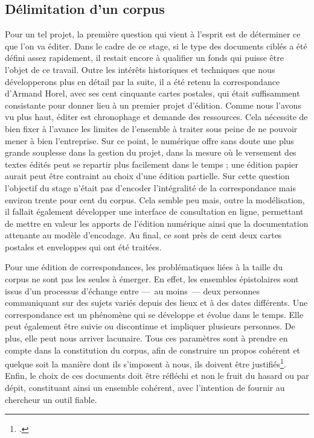 \documentclass[12pt,a4paper]{book} %
\begin{document}
\subsection{Délimitation d'un corpus}
Pour un tel projet, la première question qui vient à l'esprit est de déterminer ce que l'on va éditer. Dans le cadre de ce stage, si le type des documents ciblés a été défini assez rapidement, il restait encore à qualifier un fonds qui puisse être l'objet de ce travail. Outre les intérêts historiques et techniques que nous développerons plus en détail par la suite, il a été retenu la correspondance d'Armand Horel, avec ses  cent cinquante cartes postales, qui était suffisamment consistante pour donner lieu à un premier projet d'édition. Comme nous l'avons vu plus haut, éditer est chronophage et demande des ressources. Cela nécessite de bien fixer à l'avance les limites de l'ensemble à traiter sous peine de ne pouvoir mener à bien  l'entreprise. Sur ce point, le numérique offre sans doute une plus grande souplesse dans la gestion du projet, dans la mesure où le versement des textes édités peut se repartir plus facilement dans le temps ; une édition papier aurait peut être contraint au choix d'une édition partielle. Sur cette question l'objectif du stage n'était pas d'encoder l'intégralité de la correspondance mais environ trente pour cent du corpus. Cela semble peu mais, outre la modélisation, il fallait également développer une interface de consultation en ligne, permettant de mettre en valeur les apports de l'édition numérique ainsi que la documentation attenante au modèle d'encodage. Au final, ce sont près de cent deux cartes postales et enveloppes qui ont été traitées.

Pour une édition de correspondances, les problématiques liées à la taille du corpus ne sont pas les seules à émerger. En effet, les ensembles épistolaires sont issus d'un processus d'échange entre ---~au moins~--- deux personnes communiquant sur des sujets variés depuis des lieux et à des dates différents. Une correspondance est un phénomène qui se développe et évolue dans le temps. Elle peut également être suivie ou discontinue et  impliquer plusieurs personnes. De plus, elle peut nous arriver lacunaire. Tous ces paramètres sont à prendre en compte dans la constitution du corpus, afin de construire un propos cohérent et quelque soit la manière dont ils s'imposent à nous, ils doivent être justifiés\footcite{desenclos_early_2015}. Enfin, le choix de ces documents doit être réfléchi et non le fruit du hasard ou par dépit, constituant ainsi un ensemble cohérent, avec l'intention de fournir au chercheur un outil fiable.
\end{document}
